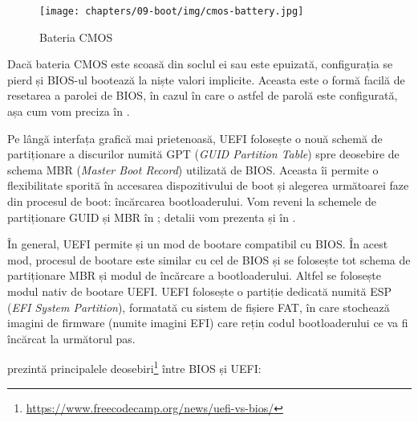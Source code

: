 \begin{figure}[!htbp]
  \centering
  \texttt{[image: chapters/09-boot/img/cmos-battery.jpg]}
  \caption{Bateria CMOS}
  \label{fig:boot:cmos-battery}
\end{figure}

Dacă bateria CMOS este scoasă din soclul ei sau este epuizată, configurația se
pierd și BIOS-ul bootează la niște valori implicite. Aceasta este o formă facilă
de resetarea a parolei de BIOS, în cazul în care o astfel de parolă este
configurată, așa cum vom preciza în .

Pe lângă interfața grafică mai prietenoasă, UEFI folosește o nouă schemă de
partiționare a discurilor numită GPT  (\textit{GUID
Partition Table}) spre deosebire de schema MBR 
(\textit{Master Boot Record}) utilizată de BIOS. Aceasta îi permite o flexibilitate
sporită în accesarea dispozitivului de boot și alegerea următoarei faze din
procesul de boot: încărcarea bootloaderului. Vom reveni la schemele de partiționare GUID și MBR în ; detalii vom prezenta și în .

În general, UEFI permite și un mod de bootare compatibil cu BIOS. În acest mod,
procesul de bootare este similar cu cel de BIOS și se folosește tot schema de
partiționare MBR și modul de încărcare a bootloaderului. Altfel se folosește
modul nativ de bootare UEFI. UEFI folosește o partiție dedicată numită ESP (\textit{EFI
System Partition}), formatată cu sistem de fișiere FAT, în care stochează imagini
de firmware (numite imagini EFI) care rețin codul bootloaderului ce va fi
încărcat la următorul pas.

 prezintă principalele deosebiri\footnote{\url{https://www.freecodecamp.org/news/uefi-vs-bios/}} între BIOS și UEFI:

